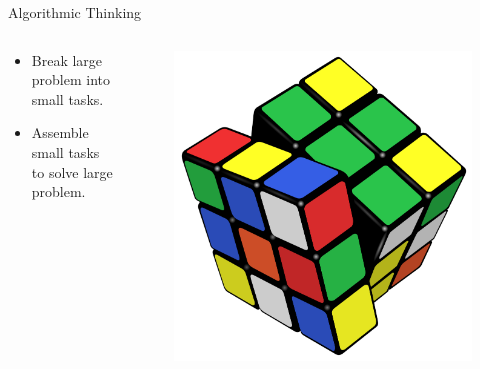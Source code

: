 \documentclass[10pt]{beamer}
\begin{document}
\begin{frame}{Algorithmic Thinking}

\begin{columns}	
	\begin{column}{0.5\textwidth}
		\begin{itemize}[<+->]
			\item Break large problem into small tasks.
			\item Assemble small tasks to solve large problem.
		\end{itemize}
	\end{column}
	\begin{column}{0.5\textwidth}
		\begin{figure}[h]		
			\centering
			\includegraphics[scale=0.075]{rubiks.png}
			\caption*{}
		\end{figure}
	\end{column}
\end{columns}

\end{frame}
\end{document}
